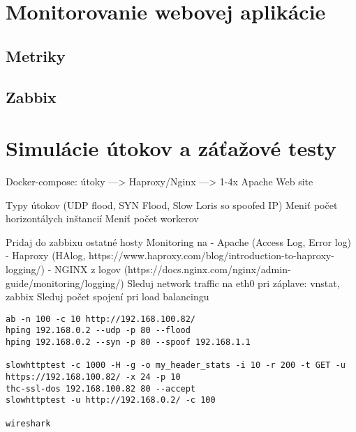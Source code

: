 \documentclass[12pt, a4paper]{article}
\begin{document}



\section{Monitorovanie webovej aplikácie}

\subsection{Metriky}

\subsection{Zabbix}

\section{Simulácie útokov a záťažové testy}
Docker-compose: útoky ---> Haproxy/Nginx ---> 1-4x Apache Web site

Typy útokov (UDP flood, SYN Flood, Slow Loris so spoofed IP)
Meniť počet horizontálych inštancií
Meniť počet workerov

Pridaj do zabbixu ostatné hosty
Monitoring na 
	- Apache (Access Log, Error log)
	- Haproxy (HAlog, https://www.haproxy.com/blog/introduction-to-haproxy-logging/)
	- NGINX z logov (https://docs.nginx.com/nginx/admin-guide/monitoring/logging/)
Sleduj network traffic na eth0 pri záplave:  vnstat, zabbix
Sleduj počet spojení pri load balancingu

\begin{lstlisting}
ab -n 100 -c 10 http://192.168.100.82/
hping 192.168.0.2 --udp -p 80 --flood  
hping 192.168.0.2 --syn -p 80 --spoof 192.168.1.1

slowhttptest -c 1000 -H -g -o my_header_stats -i 10 -r 200 -t GET -u https://192.168.100.82/ -x 24 -p 10
thc-ssl-dos 192.168.100.82 80 --accept
slowhttptest -u http://192.168.0.2/ -c 100

wireshark
\end{lstlisting}

\printbibliography[title={Literatúra}]
\end{document}
